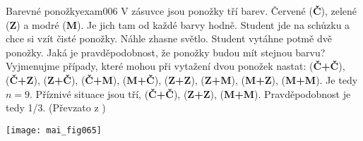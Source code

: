 \begin{mathexam}{Barevné ponožky}{exam006}
  V zásuvce jsou ponožky tří barev. Červené (\textbf{Č}), zelené (\textbf{Z}) a modré (\textbf{M}).
  Je jich tam od každé barvy hodně. Student jde na schůzku a chce si vzít čisté ponožky. Náhle
  zhasne světlo. Student vytáhne potmě dvě ponožky. Jaká je pravděpodobnost, že ponožky budou mít
  stejnou barvu? Vyjmenujme případy, které mohou při vytažení dvou ponožek nastat: (\textbf{Č+Č}),
  (\textbf{Č+Z}), (\textbf{Z+Č}), (\textbf{Č+M}), (\textbf{M+Č}), (\textbf{Z+Z}), (\textbf{Z+M}),
  (\textbf{M+Z}), (\textbf{M+M}). Je tedy \(n = 9\). Příznivé situace jsou tří, (\textbf{Č+Č}),
  (\textbf{Z+Z}), (\textbf{M+M}). Pravděpodobnost je tedy 1/3. (Převzato z
  \cite[s.~200]{Musilova2009MA1}) 

  {\centering
  \captionsetup{type=figure} 
  \texttt{[image: mai\_fig065]}
  \label{mai:fig065}
  \par}
\end{mathexam}  